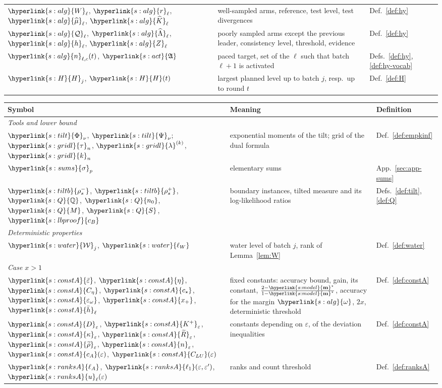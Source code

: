 \documentclass[10pt]{article}
\newcommand{\sy}[2]{{\hyperlink{#1}{#2}}}
\newcommand{\1}{\mathbf{1}}
\newcommand{\m}{\sy{s:model}{\mathbf{m}}}
\newcommand{\Wg}{\sy{s:alg}{W}}
\newcommand{\rr}{\sy{s:alg}{r}}
\newcommand{\mh}{\sy{s:alg}{\widehat\mu}}
\newcommand{\Kh}{\sy{s:alg}{\widehat K}}
\newcommand{\Qp}{\sy{s:alg}{\mathcal Q}}
\newcommand{\Lh}{\sy{s:alg}{\widehat\Lambda}}
\newcommand{\hg}{\sy{s:alg}{h}}
\newcommand{\Zg}{\sy{s:alg}{Z}}
\newcommand{\nt}{\sy{s:alg}{n}}
\newcommand{\om}{\sy{s:alg}{\omega}}
\newcommand{\Act}{\sy{s:act}{\mathfrak A}}
\newcommand{\HH}{\sy{s:H}{H}}
\newcommand{\Phis}{\sy{s:tilt}{\Phi}}
\newcommand{\Psis}{\sy{s:tilt}{\Psi}}
\newcommand{\taun}{\sy{s:gridl}{\tau}}
\newcommand{\lamk}{\sy{s:gridl}{\lambda}}
\newcommand{\kn}{\sy{s:gridl}{k}}
\newcommand{\rhom}{\sy{s:tiltb}{\rho^-_s}}
\newcommand{\rhop}{\sy{s:tiltb}{\rho^+_s}}
\newcommand{\QQ}{\sy{s:Q}{\mathbb Q}}
\newcommand{\nzero}{\sy{s:Q}{n_0}}
\newcommand{\Mb}{\sy{s:Q}{M}}
\newcommand{\Sl}{\sy{s:Q}{S}}
\newcommand{\cB}{\sy{s:lbproof}{c_B}}
\newcommand{\eb}{\sy{s:constA}{\bar\varepsilon}}
\newcommand{\eg}{\sy{s:constA}{\eta}}
\newcommand{\Ceta}{\sy{s:constA}{C_\eta}}
\newcommand{\cst}{\sy{s:constA}{c_\star}}
\newcommand{\ew}{\sy{s:constA}{\varepsilon_\omega}}
\newcommand{\De}{\sy{s:constA}{D}}
\newcommand{\Kp}{\sy{s:constA}{K^+}}
\newcommand{\kape}{\sy{s:constA}{\kappa}}
\newcommand{\Rt}{\sy{s:constA}{\widetilde R}}
\newcommand{\rt}{\sy{s:constA}{\widetilde\rho}}
\newcommand{\ngr}{\sy{s:constA}{n}}
\newcommand{\cAc}{\sy{s:constA}{c_A}}
\newcommand{\CLU}{\sy{s:constA}{C_{LU}}}
\newcommand{\hb}{\sy{s:constA}{\bar h}}
\newcommand{\xp}{\sy{s:constA}{x_+}}
\newcommand{\sig}{\sy{s:sums}{\sigma}}
\newcommand{\lA}{\sy{s:ranksA}{\ell_A}}
\newcommand{\lone}{\sy{s:ranksA}{\ell_1}}
\newcommand{\ug}{\sy{s:ranksA}{u}}
\newcommand{\Lam}{\sy{s:water}{\mathcal W}}
\newcommand{\lW}{\sy{s:water}{\ell_W}}
\begin{document}
\begin{center}
\begin{tabular}{p{4.0cm}p{8.2cm}p{2.6cm}}
$\Wg_\ell$, $\rr_\ell$, $\mh_\ell$, $\Kh_\ell$ & well-sampled arms, reference, test level, test divergences & Def.~\ref{def:hy}\\
$\Qp_\ell$, $\Lh_\ell$, $\hg_\ell$, $\Zg_\ell$ & poorly sampled arms except the previous leader, consistency level, threshold, evidence & Def.~\ref{def:hy}\\
$\nt_{\ell,c}(t)$, $\Act$ & paced target, set of the $\ell$ such that batch $\ell+1$ is activated & Defs.~\ref{def:hy}, \ref{def:hy-vocab}\\
$\HH_j$, $\HH(t)$ & largest planned level up to batch $j$, resp.\ up to round $t$ & Def.~\ref{def:H}\\
\bottomrule
\end{tabular}

\medskip
\begin{tabular}{p{4.0cm}p{8.2cm}p{2.6cm}}
\toprule
Symbol & Meaning & Definition\\ \midrule
\multicolumn{3}{l}{\emph{Tools and lower bound}}\\
$\Phis_\nu$, $\Psis_\nu$; $\taun_n$, $\lamk^{(k)}$, $\kn_n$ & exponential moments of the tilt; grid of the dual formula & Def.~\ref{def:empkinf}\\
$\sig_p$ & elementary sums & App.~\ref{sec:app-sums}\\
$\rhom$, $\rhop$, $\QQ$, $\nzero$, $\Mb$, $\Sl$, $\cB$ & boundary instances, tilted measure and its log-likelihood ratios & Defs.~\ref{def:tilt}, \ref{def:Q}\\
\midrule
\multicolumn{3}{l}{\emph{Deterministic properties}}\\
$\Lam_j$, $\lW$ & water level of batch $j$, rank of Lemma~\ref{lem:W} & Def.~\ref{def:water}\\
\midrule
\multicolumn{3}{l}{\emph{Case $x>1$}}\\
$\eb$, $\eg$, $\Ceta$, $\cst$, $\ew$, $\xp$, $\hb_\ell$ & fixed constants: accuracy bound, gain, its constant, $\frac{2-\m^\star}{1-\m^\star}$, accuracy for the margin $\om$, $2x$, deterministic threshold & Def.~\ref{def:constA}\\
$\De_\varepsilon$, $\Kp_\varepsilon$, $\kape_\varepsilon$, $\Rt_\varepsilon$, $\rt_\varepsilon$, $\ngr_\varepsilon$, $\cAc(\varepsilon)$, $\CLU(\varepsilon)$ & constants depending on $\varepsilon$, of the deviation inequalities & Def.~\ref{def:constA}\\
$\lA$, $\lone(\varepsilon,\varepsilon')$, $\ug_\ell(\varepsilon)$ & ranks and count threshold & Def.~\ref{def:ranksA}\\

\end{tabular}
\end{center}
\end{document}
